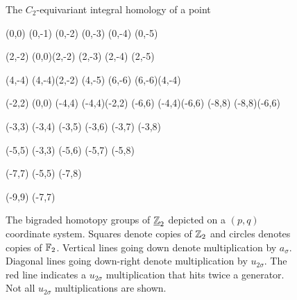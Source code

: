 \begin{figure}[t]
  \centering
  The $C_2$-equivariant integral homology of a point \\\vspace{6pt}
  \begin{sseqpage}[ xscale=0.8, yscale=0.8, x range = {-7}{4}, y range = {-4}{7}, tick step = 2, major tick step=2, minor tick step= 1, class labels = {left}, classes = fill, grid = chess, axes type = frame ]
    (0,0)
    \class["a_\sigma"](0,-1) \structline
    \class(0,-2) \structline
    \class(0,-3) \structline
    \class(0,-4) \structline
    \class(0,-5) \structline
    
    (2,-2) \structline[bend left = 40](0,0)(2,-2)
    \class(2,-3) \structline 
    \class(2,-4) \structline 
    \class(2,-5) \structline 

    \class[rectangle](4,-4) \structline[bend left = 40](4,-4)(2,-2)
    \class(4,-5) \structline
    \class[rectangle](6,-6) \structline(6,-6)(4,-4)

    (-2,2) \structline[red](0,0)
    \class[rectangle](-4,4) \structline[bend right = 40](-4,4)(-2,2)
    \class[rectangle](-6,6) \structline[bend right = 40](-4,4)(-6,6)
    \class[rectangle](-8,8) \structline[bend right = 40](-8,8)(-6,6)
    
    (-3,3) 
    \class(-3,4) \structline 
    \class(-3,5) \structline 
    \class(-3,6) \structline
    \class(-3,7) \structline
    \class(-3,8) \structline 
    
    \class(-5,5) \structline[bend left = 40](-3,3)
    \class(-5,6) \structline
    \class(-5,7) \structline
    \class(-5,8) \structline 
    
    \class(-7,7) \structline[bend left = 40](-5,5)
    \class(-7,8) \structline
    
    \class(-9,9) \structline[bend left = 40](-7,7)  
    
  \end{sseqpage}
  \caption{ {\footnotesize
      The bigraded homotopy groups of $\underline{\mathbb{Z}}_{2}$ depicted on a $(p,q)$ coordinate system.
      Squares denote copies of $\mathbb{Z}_2$ and circles denotes copies of $\operatorname{\mathbb{F}}_2$.
      Vertical lines going down denote multiplication by $a_\sigma$.
      Diagonal lines going down-right denote multiplication by $u_{2\sigma}$. 
      The red line indicates a $u_{2\sigma}$ multiplication that hits twice a generator.
      Not all $u_{2\sigma}$ multiplications are shown.}}
  \label{uZ-fig}
\end{figure}



